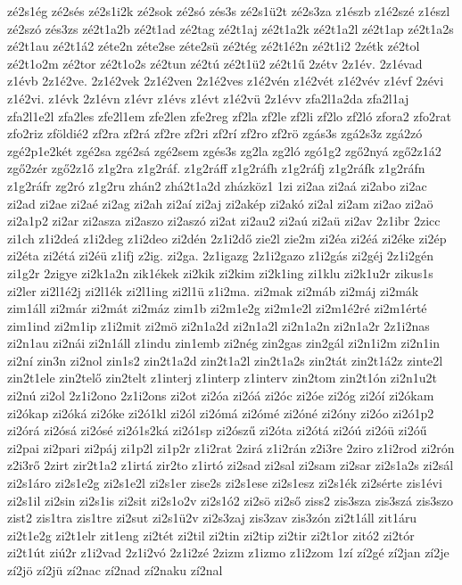 {zé2s1ég
zé2sés
zé2s1i2k
zé2sok
zé2só
zés3s
zé2s1ü2t
zé2s3za
z1észb
z1é2szé
z1észl
zé2szó
zés3zs
zé2t1a2b
zé2t1ad
zé2tag
zé2t1aj
zé2t1a2k
zé2t1a2l
zé2t1ap
zé2t1a2s
zé2t1au
zé2t1á2
zéte2n
zéte2se
zéte2sü
zé2tég
zé2t1é2n
zé2t1i2
2zétk
zé2tol
zé2t1o2m
zé2tor
zé2t1o2s
zé2tun
zé2tú
zé2t1ü2
zé2t1ű
2zétv
2z1év.
2z1évad
z1évb
2z1é2ve.
2z1é2vek
2z1é2ven
2z1é2ves
z1é2vén
z1é2vét
z1é2vév
z1évf
2zévi
z1é2vi.
z1évk
2z1évn
z1évr
z1évs
z1évt
z1é2vü
2z1évv
zfa2l1a2da
zfa2l1aj
zfa2l1e2l
zfa2les
zfe2l1em
zfe2len
zfe2reg
zf2la
zf2le
zf2li
zf2lo
zf2ló
zfora2
zfo2rat
zfo2riz
zföldié2
zf2ra
zf2rá
zf2re
zf2ri
zf2rí
zf2ro
zf2rö
zgás3s
zgá2s3z
zgá2zó
zgé2p1e2két
zgé2sa
zgé2sá
zgé2sem
zgés3s
zg2la
zg2ló
zgó1g2
zgő2nyá
zgő2z1á2
zgő2zér
zgő2z1ő
z1g2ra
z1g2ráf.
z1g2ráff
z1g2ráfh
z1g2ráfj
z1g2ráfk
z1g2ráfn
z1g2ráfr
zg2ró
z1g2ru
zhán2
zhá2t1a2d
zházköz1
1zi
zi2aa
zi2aá
zi2abo
zi2ac
zi2ad
zi2ae
zi2aé
zi2ag
zi2ah
zi2aí
zi2aj
zi2akép
zi2akó
zi2al
zi2am
zi2ao
zi2aö
zi2a1p2
zi2ar
zi2asza
zi2aszo
zi2aszó
zi2at
zi2au2
zi2aú
zi2aü
zi2av
2z1ibr
2zicc
zi1ch
z1i2deá
z1i2deg
z1i2deo
zi2dén
2z1i2dő
zie2l
zie2m
zi2éa
zi2éá
zi2éke
zi2ép
zi2éta
zi2étá
zi2éü
z1ifj
z2ig.
zi2ga.
2z1igazg
2z1i2gazo
z1i2gás
zi2géj
2z1i2gén
zi1g2r
2zigye
zi2k1a2n
zik1ékek
zi2kik
zi2kim
zi2k1ing
zi1klu
zi2k1u2r
zikus1s
zi2ler
zi2l1é2j
zi2l1ék
zi2l1ing
zi2l1ü
z1i2ma.
zi2mak
zi2máb
zi2máj
zi2mák
zim1áll
zi2már
zi2mát
zi2máz
zim1b
zi2m1e2g
zi2m1e2l
zi2m1é2ré
zi2m1érté
zim1ind
zi2m1ip
z1i2mit
zi2mö
zi2n1a2d
zi2n1a2l
zi2n1a2n
zi2n1a2r
2z1i2nas
zi2n1au
zi2nái
zi2n1áll
z1indu
zin1emb
zi2nég
zin2gas
zin2gál
zi2n1i2m
zi2n1in
zi2ní
zin3n
zi2nol
zin1s2
zin2t1a2d
zin2t1a2l
zin2t1a2s
zin2tát
zin2t1á2z
zinte2l
zin2t1ele
zin2telő
zin2telt
z1interj
z1interp
z1interv
zin2tom
zin2t1ón
zi2n1u2t
zi2nú
zi2ol
2z1i2ono
2z1i2ons
zi2ot
zi2óa
zi2óá
zi2óc
zi2óe
zi2óg
zi2óí
zi2ókam
zi2ókap
zi2óká
zi2óke
zi2ó1kl
zi2ól
zi2ómá
zi2ómé
zi2óné
zi2óny
zi2óo
zi2ó1p2
zi2órá
zi2ósá
zi2ósé
zi2ó1s2ká
zi2ó1sp
zi2ószű
zi2óta
zi2ótá
zi2óú
zi2óü
zi2óű
zi2pai
zi2pari
zi2páj
zi1p2l
zi1p2r
z1i2rat
2zirá
z1i2rán
z2i3re
2ziro
z1i2rod
zi2rón
z2i3rő
2zirt
zir2t1a2
z1irtá
zir2to
z1irtó
zi2sad
zi2sal
zi2sam
zi2sar
zi2s1a2s
zi2sál
zi2s1áro
zi2s1e2g
zi2s1e2l
zi2s1er
zise2s
zi2s1ese
zi2s1esz
zi2s1ék
zi2sérte
zis1évi
zi2s1il
zi2sin
zi2s1is
zi2sit
zi2s1o2v
zi2s1ó2
zi2sö
zi2ső
ziss2
zis3sza
zis3szá
zis3szo
zist2
zis1tra
zis1tre
zi2sut
zi2s1ü2v
zi2s3zaj
zis3zav
zis3zón
zi2t1áll
zit1áru
zi2t1e2g
zi2t1elr
zit1eng
zi2tét
zi2til
zi2tin
zi2tip
zi2tir
zi2t1or
zitó2
zi2tór
zi2t1út
ziú2r
z1i2vad
2z1i2vó
2z1i2zé
2zizm
z1izmo
z1i2zom
1zí
zí2gé
zí2jan
zí2je
zí2jö
zí2jü
zí2nac
zí2nad
zí2naku
zí2nal
}

